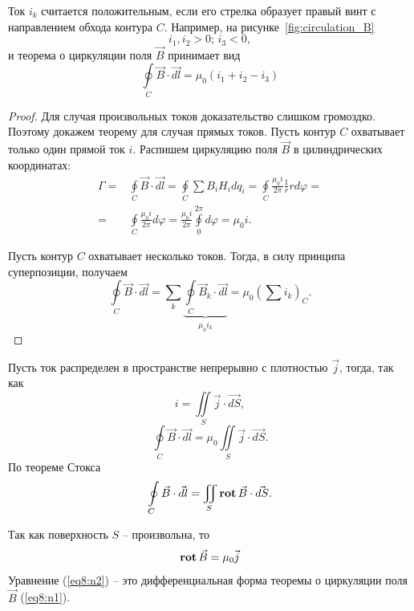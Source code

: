     \begin{remark}
        Ток \( i_k \) считается положительным, если его стрелка образует правый
        винт с направлением обхода контура \( C \). Например,
        на рисунке~\ref{fig:circulation_B}
        \[
            i_1, i_2 > 0; \, i_3 < 0,
        \]
        и теорема о циркуляции поля \( \vec{B} \) принимает вид
        \[
            \oint\limits_C \vec{B}\cdot\vec{dl} = \mu_0 (i_1 + i_2 - i_3)
        \]
    \end{remark}
    
    \begin{proof}
    Для случая произвольных токов доказательство слишком громоздко. Поэтому
    докажем теорему для случая прямых токов. Пусть контур \( C \) охватывает
    только один прямой ток \( i \). Распишем циркуляцию поля \( \vec{B} \) в
    цилиндрических координатах:
    \begin{align*}
        \Gamma = & \oint\limits_C \vec{B}\cdot\vec{dl} =
        \oint\limits_C \sum B_iH_idq_i =
        \oint\limits_C \frac{\mu_0 i}{2\pi}\frac{1}{r}rd\varphi = \\
        = & \oint\limits_C \frac{\mu_0 i}{2\pi} d\varphi =
        \frac{\mu_0 i}{2\pi} \oint\limits_0^{2\pi}d\varphi = \mu_0 i.
    \end{align*}
    
    Пусть контур \( C \) охватывает несколько токов. Тогда, в силу принципа
    суперпозиции, получаем
    \[
        \oint\limits_C \vec{B}\cdot\vec{dl} = \sum\limits_k
        \underbrace{ \oint\limits_C \vec{B}_k\cdot\vec{dl} }_{\mu_0 i_k} =
        \mu_0 (\sum i_k)_C.
    \]
    \end{proof}
    
    Пусть ток распределен в пространстве непрерывно с плотностью \( \vec{j} \),
    тогда, так как
    \[
        i = \iint\limits_S \vec{j}\cdot\vec{dS},
    \]
    \[
        \oint\limits_C \vec{B}\cdot\vec{dl} =
        \mu_0 \iint\limits_S \vec{j}\cdot\vec{dS}.
    \]
    По теореме Стокса
    \[
        \oint\limits_C \vec{B}\cdot\vec{dl} =
        \iint\limits_S \mathbf{rot\,}\vec{B}\cdot\vec{dS}.
    \]
    
    Так как поверхность \( S \) -- произвольна, то
    \begin{equation}
        \mathbf{rot\,}\vec{B} = \mu_0 \vec{j}
        \label{eq8:n2}
    \end{equation}
    Уравнение (\ref{eq8:n2}) -- это дифференциальная форма теоремы о циркуляции
    поля \( \vec{B} \) (\ref{eq8:n1}).
    
